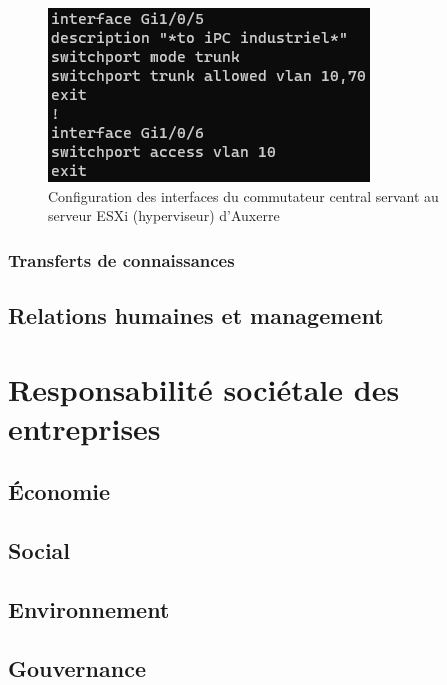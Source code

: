 \documentclass[12pt, oneside, a4paper, titlepage]{report}
\begin{document}
\begin{figure}[h!]
    \centering
    \includegraphics[width = 0.5\linewidth]{img/sw-auxr/esxi-ifs.png}
    \caption{%
        Configuration des interfaces du commutateur central servant au serveur
        ESXi (hyperviseur) d'Auxerre%
    }%
    \label{fig:sw-auxr/esxi-ifs}
\end{figure}

\FloatBarrier{}
\subsection{Transferts de connaissances}%
\label{sub:mission::main::trans}


\section{Relations humaines et management}%
\label{sec:mission::rhm}


\chapter{Responsabilité sociétale des entreprises}%
\label{cha:rse}

\section{Économie}%
\label{sec:rse::eco}

\section{Social}%
\label{sec:rse::social}

\section{Environnement}%
\label{sec:rse::env}

\section{Gouvernance}%
\label{sec:rse::gouv}
\end{document}
